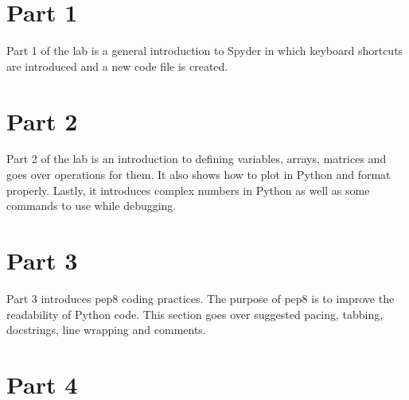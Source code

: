 \tableofcontents

\newpage

\section{Part 1}


Part 1 of the lab is a general introduction to Spyder in which keyboard shortcuts are introduced and a new code file is created.

\section{Part 2}


Part 2 of the lab is an introduction to defining variables, arrays, matrices and goes over operations for them.  It also shows how to plot in Python and format properly.  Lastly, it introduces complex numbers in Python as well as some commands to use while debugging.

\section{Part 3}

Part 3 introduces pep8 coding practices.  The purpose of pep8 is to improve the readability of Python code.  This section goes over suggested pacing, tabbing, docstrings, line wrapping and comments.

\section{Part 4}

